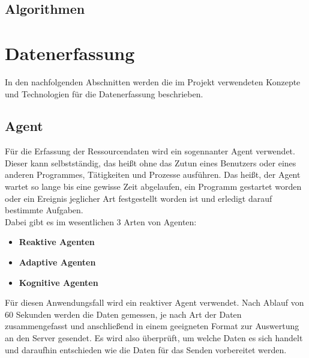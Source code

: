\documentclass{report}
\begin{document}
\subsection{Algorithmen}

\section{Datenerfassung}
In den nachfolgenden Abschnitten werden die im Projekt verwendeten Konzepte und Technologien für die Datenerfassung beschrieben.

\subsection{Agent}
Für die Erfassung der Ressourcendaten wird ein sogennanter Agent verwendet. Dieser kann selbstständig, das heißt ohne das Zutun eines Benutzers oder eines anderen Programmes, Tätigkeiten und Prozesse ausführen. Das heißt, der Agent wartet so lange bis eine gewisse Zeit abgelaufen, ein Programm gestartet worden oder ein Ereignis jeglicher Art festgestellt worden ist und erledigt darauf bestimmte Aufgaben.\\
Dabei gibt es im wesentlichen 3 Arten von Agenten:
\begin{itemize}
    \item \textbf{Reaktive Agenten}
    \item \textbf{Adaptive Agenten}
    \item \textbf{Kognitive Agenten}
\end{itemize}
Für diesen Anwendungsfall wird ein reaktiver Agent verwendet. Nach Ablauf von 60 Sekunden werden die Daten gemessen, je nach Art der Daten zusammengefasst und anschließend in einem geeigneten Format zur Auswertung an den Server gesendet. Es wird also überprüft, um welche Daten es sich handelt und daraufhin entschieden wie die Daten für das Senden vorbereitet werden.
\end{document}
